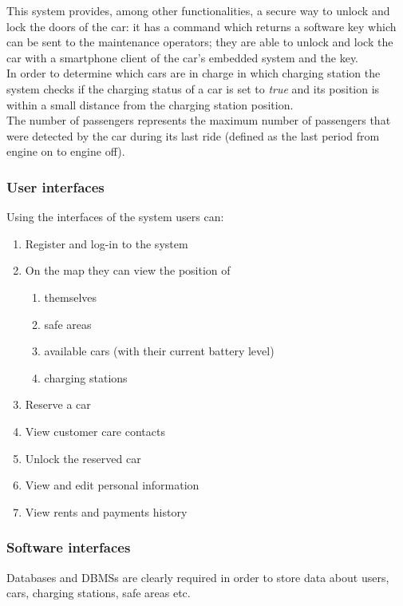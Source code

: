 	This system provides, among other functionalities, a secure way to unlock and lock the doors of the car: it has a command which returns a software key which can be sent to the maintenance operators; they are able to unlock and lock the car with a smartphone client  of the car's embedded system and the key.\\
	
	In order to determine which cars are in charge in which charging station the system checks if the charging status of a car is set to \emph{true} and its position is within a small distance from the charging station position.\\
	
	The number of passengers represents the maximum number of passengers that were detected by the car during its last ride (defined as the last period from engine on to engine off).\\
		
\subsubsection{User interfaces}
	Using the interfaces of the system users can:
	\begin{enumerate}
		\item Register and log-in to the system
		\item On the map they can view the position of
			\begin{enumerate}[label=\alph*)]
				\item themselves
				\item safe areas
				\item available cars (with their current battery level)
				\item charging stations
			\end{enumerate}
		\item Reserve a car
		\item View customer care contacts 
		\item Unlock the reserved car
		\item View and edit personal information
		\item View rents and payments history
	\end{enumerate}

\subsubsection{Software interfaces}
Databases and DBMSs are clearly required in order to store data about users, cars, charging stations, safe areas etc.

